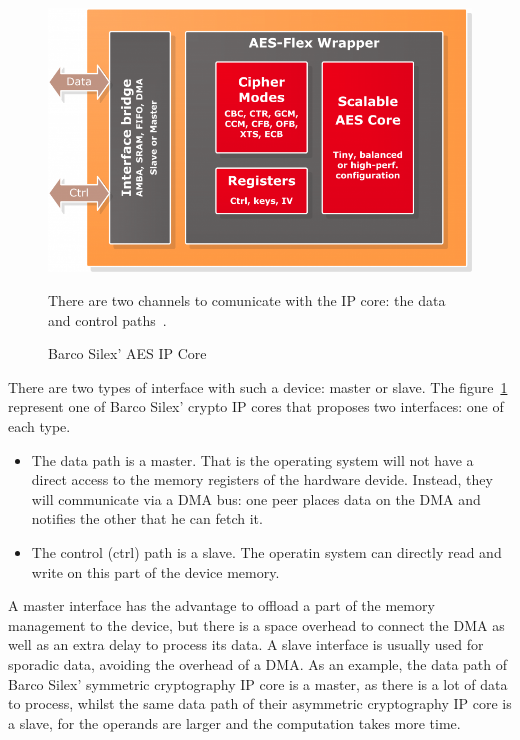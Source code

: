 \begin{figure}
\includegraphics[width=\linewidth]{barco-ba411e-ipcore}
\caption{Barco Silex' AES IP Core}{There are two channels to comunicate with the IP core: the data and control paths~\cite{barco-ba411e}.}
\label{fig:barco-ba411e-ipcore}
\end{figure}

There are two types of interface with such a device: master or slave.
The figure~\ref{fig:barco-ba411e-ipcore}  represent one of Barco Silex' crypto IP cores that proposes two interfaces: one of each type.
\begin{itemize}
	\item The data path is a master. That is the operating system will not have a direct access to the memory registers of the hardware devide. Instead, they will communicate via a DMA bus: one peer places data on the DMA and notifies the other that he can fetch it.
	\item The control (ctrl) path is a slave. The operatin system can directly read and write on this part of the device memory.
\end{itemize}

A master interface has the advantage to offload a part of the memory management to the device, but there is a space overhead to connect the DMA as well as an extra delay to process its data.
A slave interface is usually used for sporadic data, avoiding the overhead of a DMA.
As an example, the data path of Barco Silex' symmetric cryptography IP core is a master, as there is a lot of data to process, whilst the same data path of their asymmetric cryptography IP core is a slave, for the operands are larger and the computation takes more time.



